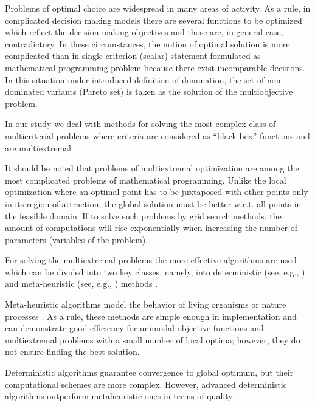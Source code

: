 \documentclass[runningheads]{llncs}
\begin{document}
\cite{Miettinen1999,Ehrgott2005,Pardalos2017,ML_MCO_2023,Evtushenko2014,Deb2002,Durillo2010,Mostaghim2007,NDG09,RC05,ZLT01,Gergel2019_2,Gergel2018,GergelKozinov2020,Marler2004,Strongin2000,Sergeyev2013,SVM_2000,PROB_2004,iOpt_url,Grishagin2015_2}

Problems of optimal choice are widespread in many areas of activity. As a rule, in complicated decision making models there are several functions to be optimized which reflect the decision making objectives and those are, in general case, contradictory. In these circumstances, the notion of optimal solution is more complicated than in single criterion (scalar) statement formulated as mathematical programming problem because there exist incomparable decisions. In this situation under introduced definition of domination, the set of non-dominated variants (Pareto set) is taken as the solution of the multiobjective problem.

In our study we deal with methods for solving the most complex class of multicriterial problems where criteria are considered as ``black-box'' functions and are multiextremal \cite{Miettinen1999,Ehrgott2005,Pardalos2017,Strongin2000,Sergeyev2013}.

It should be noted that problems of multiextremal optimization are among the most complicated problems of mathematical programming. Unlike the local optimization where an optimal point has to be juxtaposed with other points only in its region of attraction, the global solution must be better w.r.t. all points in the feasible domain. If to solve such problems by grid search methods, the amount of computations will rise exponentially when increasing the number of parameters (variables of the problem).

For solving the multiextremal problems the more effective algorithms are used which can be divided into two key classes, namely, into deterministic (see, e.g., \cite{Evtushenko2014,Gergel2018,GergelKozinov2020,Paulavicius2020,Jones2021}) and meta-heuristic (see, e.g., \cite{Battiti2009,Gendreau2010,Eiben2015}) methods . 

Meta-heuristic algorithms model the behavior of living organisms or nature processes \cite{Deb2002,Durillo2010,Mostaghim2007,NDG09,RC05,ZLT01}. As a rule, these methods are simple enough in implementation and can demonstrate good efficiency for unimodal objective functions and multiextremal problems with a small number of local optima; however, they do not ensure finding the best solution.

Deterministic algorithms guarantee convergence to global optimum, but their computational schemes are more complex. However, advanced deterministic algorithms outperform metaheuristic ones in terms of quality \cite{Kvasov2018,Sergeyev2018}.
\end{document}
